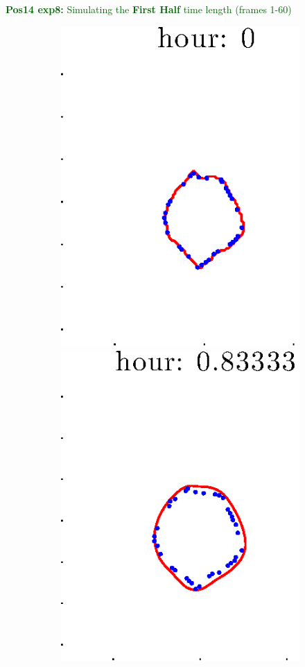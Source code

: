 \documentclass[12pt]{article}
\begin{document}
\clearpage

\noindent \textcolor{DarkGreen}{\textbf{Pos14 exp8:} Simulating the \textbf{First Half} time length (frames 1-60)}

\begin{figure}[h!]
\centering
	\begin{subfigure}[b]{.3\textwidth}
	\centering
		\includegraphics[height=.15\textheight]{Pos14exp8/firsthalf/full1.eps}
		\includegraphics[height=.15\textheight]{Pos14exp8/firsthalf/full2.eps}

\end{subfigure}
\end{figure}
\end{document}
